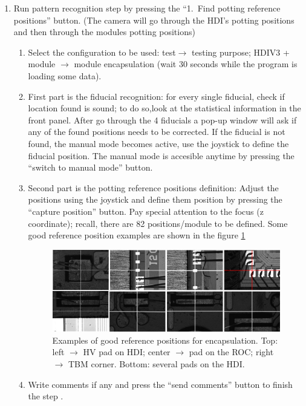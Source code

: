 \documentclass[12pt]{unlsilabsop}
\begin{document}
\begin{enumerate}
  \item Run pattern recognition step by pressing the ``1.~Find potting reference positions'' button. (The camera will go through the HDI's potting positions and then through the modules potting positions)
    \begin{enumerate}
    \item Select the configuration to be used: test$\to$ testing purpose; HDIV3 + module $\to$ module encapsulation (wait 30 seconds while the program is loading some data). 
    \item First part is the fiducial recognition: for every single fiducial, check if location found is sound; to do so,look at the statistical information in the front panel. After go through the 4 fiducials a pop-up window will ask if any of the found positions needs to be corrected. If the fiducial is not found, the manual mode becomes active, use the joystick to define the fiducial position. The manual mode is accesible anytime by pressing the ``switch to manual mode'' button.   
    \item Second part is the potting reference positions definition: Adjust the positions using the joystick and define them position by pressing the ``capture position'' button. Pay special attention to the focus (z coordinate); recall, there are 82 positions/module to be defined. Some good reference position examples are shown in the figure \ref{ref_positions} 
    \begin{figure}[ht]
            \begin{center}
              \includegraphics[width=\textwidth]{img/ref_positions.jpg}
              \caption{Examples of good reference positions for encapsulation. Top: left $\to$ HV pad on HDI; center $\to$ pad on the ROC; right $\to$ TBM corner. Bottom: several pads on the HDI.}
              \label{ref_positions}
            \end{center}
          \end{figure}
    \item Write comments if any and press the ``send comments'' button to finish the step .

\end{enumerate}
\end{enumerate}
\end{document}
